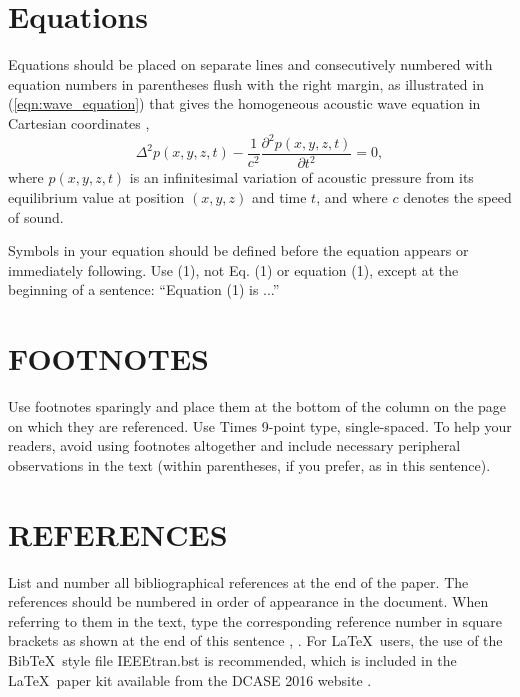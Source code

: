 \documentclass{article}
\begin{document}
\begin{sloppy}

\section{Equations}
\label{sec:equations}

Equations should be placed on separate lines and consecutively
numbered with equation numbers in parentheses flush with the 
right margin, as illustrated in (\ref{eqn:wave_equation}) 
that gives the homogeneous acoustic wave equation in
Cartesian coordinates \cite{eWilliams1999},
\begin{equation}
  \label{eqn:wave_equation}
    \Delta^2p(x,y,z,t)-
    \displaystyle\frac{1}{c^2}\frac{\partial^2p(x,y,z,t)}{\partial t^2}=0,
\end{equation}
where $p(x,y,z,t)$ is an infinitesimal variation of acoustic 
pressure from its equilibrium value at position $(x,y,z)$ and 
time $t$, and where $c$ denotes the speed of sound.

Symbols in your equation should be defined before the equation 
appears or immediately following.  Use (1), not Eq. (1) or 
equation (1), except at the beginning of a sentence:  
``Equation (1) is ...''



\section{FOOTNOTES}
\label{sec:foot}

Use footnotes sparingly and place them at 
the bottom of the column on the page on which they are 
referenced. Use Times 9-point type, single-spaced. To 
help your readers, avoid using footnotes altogether and
include necessary peripheral observations in the text 
(within parentheses, if you prefer, as in this sentence).

\section{REFERENCES}
\label{sec:ref}

List and number all bibliographical references at the end 
of the paper. The references should be numbered in order 
of appearance in the document. When referring to them in 
the text, type the corresponding reference number in 
square brackets as shown at the end of this sentence 
\cite{cJones2003}, \cite{aSmith2000}. For \LaTeX\ users, 
the use of the Bib\TeX\ style file IEEEtran.bst is 
recommended, which is included in the \LaTeX\ paper 
kit available from the DCASE 2016 website \cite{dcase2016web}.


\end{sloppy}
\end{document}
